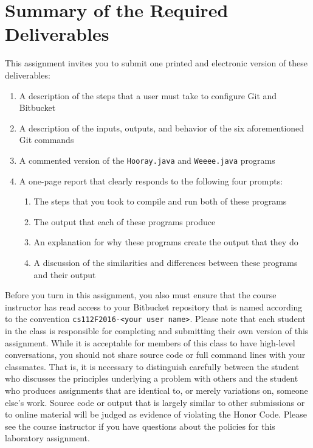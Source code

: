 \section*{Summary of the Required Deliverables}

  This assignment invites you to submit one printed and electronic version of these deliverables:

  \vspace*{-.05in}
  \begin{enumerate}
  \itemsep 0em
    \item A description of the steps that a user must take to configure Git and Bitbucket
    \item A description of the inputs, outputs, and behavior of the six aforementioned Git commands
    \item A commented version of the {\tt Hooray.java} and {\tt Weeee.java} programs
    \item A one-page report that clearly responds to the following four prompts:

      \vspace*{-.05in}
      \begin{enumerate}

        \item The steps that you took to compile and run both of these programs

        \item The output that each of these programs produce

        \item An explanation for why these programs create the output that they do

        \item A discussion of the similarities and differences between these programs and their output

      \end{enumerate}

  \end{enumerate}

Before you turn in this assignment, you also must ensure that the course instructor has read access to your Bitbucket
repository that is named according to the convention {\tt cs112F2016-<your user name>}. Please note that each student in
the class is responsible for completing and submitting their own version of this assignment. While it is acceptable for
members of this class to have high-level conversations, you should not share source code or full command lines with your
classmates.  That is, it is necessary to distinguish carefully between the student who discusses the principles
underlying a problem with others and the student who produces assignments that are identical to, or merely variations
on, someone else's work.  Source code or output that is largely similar to other submissions or to online material will
be judged as evidence of violating the Honor Code. Please see the course instructor if you have questions about the policies
for this laboratory assignment.


